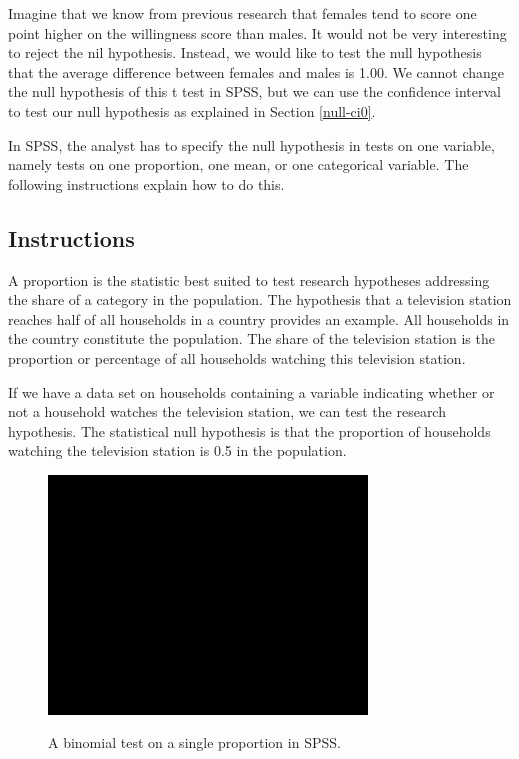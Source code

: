 \documentclass[a4paper]{book}
\theoremstyle{definition}
\theoremstyle{definition}
\theoremstyle{definition}
\theoremstyle{remark}
\begin{document}
Imagine that we know from previous research that females tend to score
one point higher on the willingness score than males. It would not be
very interesting to reject the nil hypothesis. Instead, we would like to
test the null hypothesis that the average difference between females and
males is 1.00. We cannot change the null hypothesis of this t test in
SPSS, but we can use the confidence interval to test our null hypothesis
as explained in Section \ref{null-ci0}.

In SPSS, the analyst has to specify the null hypothesis in tests on one
variable, namely tests on one proportion, one mean, or one categorical
variable. The following instructions explain how to do this.

\subsection{Instructions}\label{instructions-2}

A proportion is the statistic best suited to test research hypotheses
addressing the share of a category in the population. The hypothesis
that a television station reaches half of all households in a country
provides an example. All households in the country constitute the
population. The share of the television station is the proportion or
percentage of all households watching this television station.

If we have a data set on households containing a variable indicating
whether or not a household watches the television station, we can test
the research hypothesis. The statistical null hypothesis is that the
proportion of households watching the television station is 0.5 in the
population.

\begin{figure}[H]
\href{https://www.youtube.com/embed/cA0idFxW-J4}{\includegraphics[width=320px]{GentleIntro_files/figure-latex/SPSSbinomial-1} }\caption{A binomial test on a single proportion in SPSS.}\label{fig:SPSSbinomial}
\end{figure}
\end{document}
